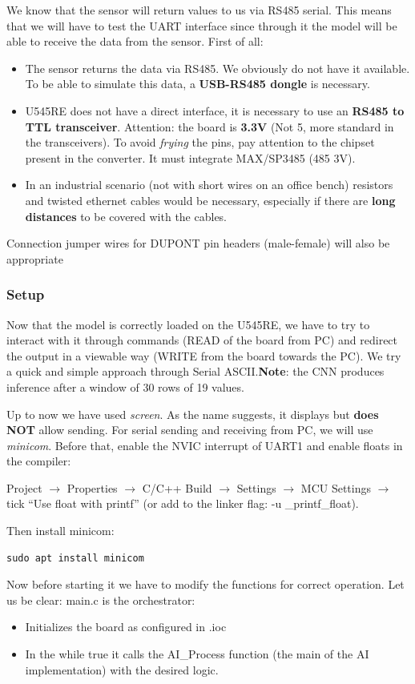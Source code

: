 We know that the sensor will return values to us via RS485 serial. This means that we will have to test the UART interface since through it the model will be able to receive the data from the sensor. First of all: 

\begin{itemize}
    \item The sensor returns the data via RS485. We obviously do not have it available. To be able to simulate this data, a \textbf{USB-RS485 dongle} is necessary. 
    \item U545RE does not have a direct interface, it is necessary to use an \textbf{RS485 to TTL transceiver}. Attention: the board is \textbf{3.3V} (Not 5, more standard in the transceivers). To avoid \textit{frying} the pins, pay attention to the chipset present in the converter. It must integrate MAX/SP3485 (485 3V). 
    \item In an industrial scenario (not with short wires on an office bench) resistors and twisted ethernet cables would be necessary, especially if there are \textbf{long distances} to be covered with the cables.
\end{itemize}
Connection jumper wires for DUPONT pin headers (male-female) will also be appropriate

\subsubsection{Setup}
Now that the model is correctly loaded on the U545RE, we have to try to interact with it through commands (READ of the board from PC) and redirect the output in a viewable way (WRITE from the board towards the PC). We try a quick and simple approach through Serial ASCII.\textbf{Note}: the CNN produces inference after a window of 30 rows of 19 values. 

Up to now we have used \textit{screen}. As the name suggests, it displays but \textbf{does NOT} allow sending. For serial sending and receiving from PC, we will use \textit{minicom}. Before that, enable the NVIC interrupt of UART1 and enable floats in the compiler: 
\begin{center}
    Project $\rightarrow$ Properties $\rightarrow$ C/C++ Build $\rightarrow$ Settings $\rightarrow$ MCU Settings $\rightarrow$ tick “Use float with printf” (or add to the linker flag: -u \_printf\_float).
\end{center}
Then install minicom: 

\begin{verbatim}
sudo apt install minicom
\end{verbatim}
Now before starting it we have to modify the functions for correct operation. Let us be clear: 
main.c is the orchestrator: 
\begin{itemize}
    \item Initializes the board as configured in .ioc
    \item In the while true it calls the AI_Process function (the main of the AI implementation) with the desired logic.
\end{itemize}

